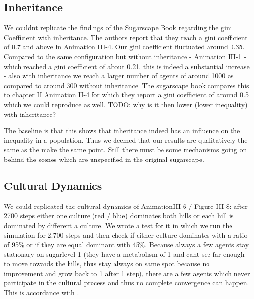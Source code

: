\subsection{Inheritance}
We couldnt replicate the findings of the Sugarscape Book regarding the gini Coefficient with inheritance. The authors report that they reach a gini coefficient of 0.7 and above in Animation III-4. Our gini coefficient fluctuated around 0.35. Compared to the same configuration but without inheritance - Animation III-1 - which reached a gini coefficient of about 0.21, this is indeed a substantial increase - also with inheritance we reach a larger number of agents of around 1000 as compared to around 300 without inheritance.
The sugarscape book compares this to chapter II Animation II-4 for which they report a gini coefficient of around 0.5 which we could reproduce as well. TODO: why is it then lower (lower inequality) with inheritance?

The baseline is that this shows that inheritance indeed has an influence on the inequality in a population. Thus we deemed that our results are qualitatively the same as the make the same point. Still there must be some mechanisms going on behind the scenes which are unspecified in the original sugarscape.

\subsection{Cultural Dynamics}
We could replicated the cultural dynamics of AnimationIII-6 / Figure III-8: after 2700 steps either one culture (red / blue) dominates both hills or each hill is dominated by different a culture. We wrote a test for it in which we run the simulation for 2.700 steps and then check if either culture dominates with a ratio of 95\% or if they are equal dominant with 45\%. Because always a few agents stay stationary on sugarlevel 1 (they have a metabolism of 1 and cant see far enough to move towards the hills, thus stay always on same spot because no improvement and grow back to 1 after 1 step), there are a few agents which never participate in the cultural process and thus no complete convergence can happen. This is accordance with \cite{weaver_replicating_nodate}.

